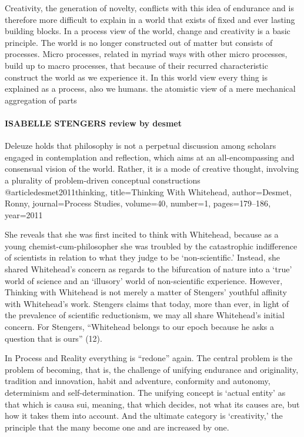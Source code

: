 Creativity, the generation of novelty, conflicts with this idea of endurance and is therefore more difficult to explain in a world that exists of fixed and ever lasting building blocks.
In a process view of the world, change and creativity is a basic principle. The world is no longer constructed out of matter but consists of processes. Micro processes, related in myriad ways with other micro processes, build up to macro processes, that because of their recurred characteristic construct the world as we experience it. In this world view every thing is explained as a process, also we humans. 
\cite[ch 5]{rapp1990whitehead}
the atomistic view of a mere mechanical aggregation of parts

\paragraph{ISABELLE STENGERS review by desmet}
Deleuze holds that
philosophy is not a perpetual discussion among scholars engaged in contemplation
and reflection, which aims at an all-encompassing and consensual vision of the world.
Rather, it is a mode of creative thought, involving a plurality of problem-driven
conceptual constructions
\cite{keylist}
@article{desmet2011thinking,
	title={Thinking With Whitehead},
	author={Desmet, Ronny},
	journal={Process Studies},
	volume={40},
	number={1},
	pages={179--186},
	year={2011}
	}

She reveals that she was first incited to think with Whitehead,
because as a young chemist-cum-philosopher she was troubled by the catastrophic
indifference of scientists in relation to what they judge to be ‘non-scientific.’ Instead,
she shared Whitehead’s concern as regards to the bifurcation of nature into a ‘true’
world of science and an ‘illusory’ world of non-scientific experience. However,
Thinking with Whitehead is not merely a matter of Stengers’ youthful affinity with
Whitehead’s work. Stengers claims that today, more than ever, in light of the
prevalence of scientific reductionism, we may all share Whitehead’s initial concern.
For Stengers, “Whitehead belongs to our epoch because he asks a question that is
ours” (12).

In Process and Reality everything is
“redone” again. The central problem is the problem of becoming, that is, the
challenge of unifying endurance and originality, tradition and innovation, habit and
adventure, conformity and autonomy, determinism and self-determination. The
unifying concept is ‘actual entity’ as that which is causa sui, meaning, that which
decides, not what its causes are, but how it takes them into account. And the ultimate
category is ‘creativity,’ the principle that the many become one and are increased by
one.
	
